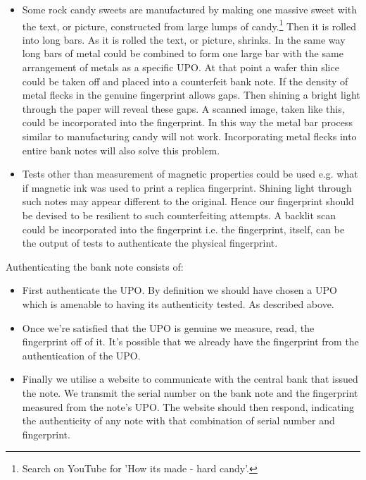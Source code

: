 \documentclass[smallextended]{svjour3}       	\smartqed  \usepackage{graphicx}
\begin{document}
\begin{itemize}
  \item Some rock candy sweets are manufactured by making one massive sweet with the text, or picture, constructed from large lumps of candy.\footnote{Search on YouTube for 'How its made - hard candy'.} Then it is rolled into long bars. As it is rolled the text, or picture, shrinks. In the same way long bars of metal could be combined to form one large bar with the same arrangement of metals as a specific UPO. At that point a wafer thin slice could be taken off and placed into a counterfeit bank note. If the density of metal flecks in the genuine fingerprint allows gaps. Then shining a bright light through the paper will reveal these gaps. A scanned image, taken like this, could be incorporated into the fingerprint. In this way the metal bar process similar to manufacturing candy will not work. Incorporating metal flecks into entire bank notes will also solve this problem.

  \item Tests other than measurement of magnetic properties could be used e.g. what if magnetic ink was used to print a replica fingerprint. Shining light through such notes may appear different to the original. Hence our fingerprint should be devised to be resilient to such counterfeiting attempts. A backlit scan could be incorporated into the fingerprint i.e. the fingerprint, itself, can be the output of tests to authenticate the physical fingerprint.

\end{itemize}

\par Authenticating the bank note consists of:

\vspace{1mm}

\begin{itemize}

  \item First authenticate the UPO. By definition we should have chosen a UPO which is amenable to having its authenticity tested. As described above.

  \item Once we're satisfied that the UPO is genuine we measure, read, the fingerprint off of it. It's possible that we already have the fingerprint from the authentication of the UPO.

  \item Finally we utilise a website to communicate with the central bank that issued the note. We transmit the serial number on the bank note and the fingerprint measured from the note's UPO. The website should then respond, indicating the authenticity of any note with that combination of serial number and fingerprint.

\end{itemize}
\end{document}
